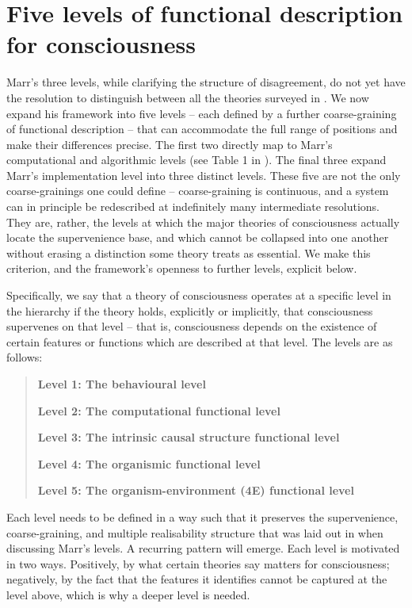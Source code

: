 \documentclass[11pt, a4paper, onecolumn, gdm]{google}
\begin{document}
\section{Five levels of functional description for consciousness}\label{five-levels-of-functional-description-for-consciousness}

Marr's three levels, while clarifying the structure of disagreement, do not yet have the resolution to distinguish between all the theories surveyed in .
We now expand his framework into five levels -- each defined by a further coarse-graining of functional description -- that can accommodate the full range of positions and make their differences precise.
The first two directly map to Marr's computational and algorithmic levels (see Table 1 in ).
The final three expand Marr's implementation level into three distinct levels.
These five are not the only coarse-grainings one could define -- coarse-graining is continuous, and a system can in principle be redescribed at indefinitely many intermediate resolutions.
They are, rather, the levels at which the major theories of consciousness actually locate the supervenience base, and which cannot be collapsed into one another without erasing a distinction some theory treats as essential.
We make this criterion, and the framework's openness to further levels, explicit below.

Specifically, we say that a theory of consciousness operates at a specific level in the hierarchy if the theory holds, explicitly or implicitly, that consciousness supervenes on that level -- that is, consciousness depends on the existence of certain features or functions which are described at that level.
The levels are as follows:

\begin{quote}
\textbf{Level 1: The behavioural level}

\textbf{Level 2: The computational functional level}

\textbf{Level 3: The intrinsic causal structure functional level}

\textbf{Level 4: The organismic functional level}

\textbf{Level 5: The organism-environment (4E) functional level} \end{quote}

Each level needs to be defined in a way such that it preserves the supervenience, coarse-graining, and multiple realisability structure that was laid out in  when discussing Marr's levels.
A recurring pattern will emerge.
Each level is motivated in two ways.
Positively, by what certain theories say matters for consciousness; negatively, by the fact that the features it identifies cannot be captured at the level above, which is why a deeper level is needed.
\end{document}
